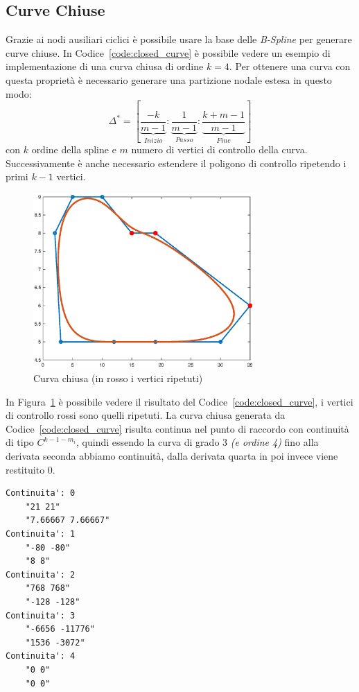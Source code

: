 \documentclass[a4paper, 12pt]{article}
\begin{document}
\subsection{Curve Chiuse}
Grazie ai nodi ausiliari ciclici è possibile usare la base delle \textit{B-Spline} per generare
curve chiuse. In Codice~\ref{code:closed_curve} è possibile vedere un esempio di implementazione di una curva chiusa di 
ordine $k = 4$.
Per ottenere una curva con questa proprietà è necessario generare una partizione nodale estesa in questo modo:
$$\Delta^* = \left[ \underbrace{\frac{-k}{m-1}}_{Inizio} : \underbrace{\frac{1}{m-1}}_{Passo} : \underbrace{\frac{k+m-1}{m-1}}_{Fine} \right]$$
con $k$ ordine della spline e $m$ numero di vertici di controllo della curva.
Successivamente è anche necessario estendere il poligono di controllo ripetendo i primi $k-1$ vertici.

\begin{figure}[]
  \centering
  \includegraphics[width=0.75\textwidth]{figure/closed_curve.eps}
  \caption{Curva chiusa (in rosso i vertici ripetuti)}
  \label{fig:closed_curve}
\end{figure} 
In Figura~\ref{fig:closed_curve} è possibile vedere il risultato del Codice~\ref{code:closed_curve}, i vertici di controllo rossi sono 
quelli ripetuti.
La curva chiusa generata da Codice~\ref{code:closed_curve} risulta continua nel punto di raccordo con continuità di tipo $C^{k-1-m_i}$, quindi 
essendo la curva di grado 3 \textit{(e ordine 4)} fino alla derivata seconda abbiamo continuità, dalla derivata quarta in poi invece viene restituito $0$.
\begin{verbatim}
Continuita': 0
    "21 21"
    "7.66667 7.66667"
Continuita': 1
    "-80 -80"
    "8 8"
Continuita': 2
    "768 768"
    "-128 -128"
Continuita': 3
    "-6656 -11776"
    "1536 -3072"
Continuita': 4
    "0 0"
    "0 0"
\end{verbatim}
\end{document}

